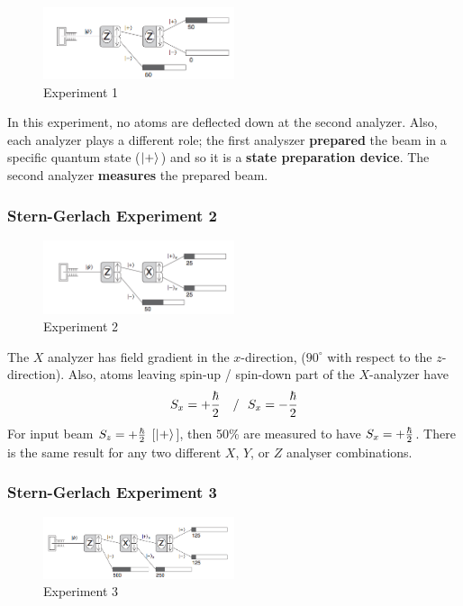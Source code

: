\documentclass[english, 11pt]{article}
\begin{document}
         \begin{figure}[t!]
            \centering
            \includegraphics[width=0.5\textwidth]{stern_gerlach_exp1.png}
            \caption{Experiment 1}
         \end{figure}

         In this experiment, no atoms are deflected down at the second analyzer. Also, each analyzer plays a different role; the first analyszer \textbf{prepared} the beam in a specific quantum state ($\left| + \rangle \right.$) and so it is a \textbf{state preparation device}. The second analyzer \textbf{measures} the prepared beam.

       \subsubsection{Stern-Gerlach Experiment 2}

         \begin{figure}[t!]
            \centering
            \includegraphics[width=0.5\textwidth]{stern_gerlach_exp2.png}
            \caption{Experiment 2}
         \end{figure}

         The $X$ analyzer has field gradient in the $x$-direction, ($90^{\circ}$ with respect to the $z$-direction). Also, atoms leaving spin-up / spin-down part of the $X$-analyzer have
         \[ S_x = + \frac{\hbar}{2} \ \ \ / \ \ S_x = - \frac{\hbar}{2} \]
         For input beam $S_z = + \frac{\hbar}{2}$ [$\left| + \rangle \right.$], then 50\% are measured to have $S_x = +\frac{\hbar}{2}$. There is the same result for any two different $X$, $Y$, or $Z$ analyser combinations.

       \subsubsection{Stern-Gerlach Experiment 3}

         \begin{figure}[b!]
            \centering
            \includegraphics[width=0.5\textwidth]{stern_gerlach_exp3.png}
            \caption{Experiment 3}
         \end{figure}
\end{document}
